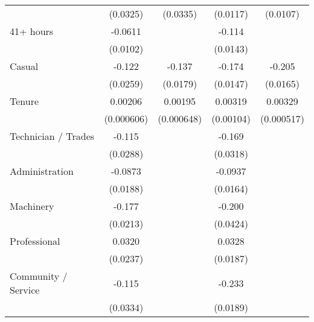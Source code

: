 {\begin{tabular}{l*{4}{c}}
                    &    (0.0325)         &    (0.0335)         &    (0.0117)         &    (0.0107)         \\
[1em]
41+ hours           &     -0.0611\sym{***}&                     &      -0.114\sym{***}&                     \\
                    &    (0.0102)         &                     &    (0.0143)         &                     \\
[1em]
Casual              &      -0.122\sym{***}&      -0.137\sym{***}&      -0.174\sym{***}&      -0.205\sym{***}\\
                    &    (0.0259)         &    (0.0179)         &    (0.0147)         &    (0.0165)         \\
[1em]
Tenure              &     0.00206\sym{***}&     0.00195\sym{**} &     0.00319\sym{**} &     0.00329\sym{***}\\
                    &  (0.000606)         &  (0.000648)         &   (0.00104)         &  (0.000517)         \\
[1em]
Technician / Trades &      -0.115\sym{***}&                     &      -0.169\sym{***}&                     \\
                    &    (0.0288)         &                     &    (0.0318)         &                     \\
[1em]
Administration      &     -0.0873\sym{***}&                     &     -0.0937\sym{***}&                     \\
                    &    (0.0188)         &                     &    (0.0164)         &                     \\
[1em]
Machinery           &      -0.177\sym{***}&                     &      -0.200\sym{***}&                     \\
                    &    (0.0213)         &                     &    (0.0424)         &                     \\
[1em]
Professional        &      0.0320         &                     &      0.0328         &                     \\
                    &    (0.0237)         &                     &    (0.0187)         &                     \\
[1em]
Community / Service &      -0.115\sym{***}&                     &      -0.233\sym{***}&                     \\
                    &    (0.0334)         &                     &    (0.0189)         &                     \\

\end{tabular}}
